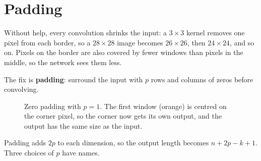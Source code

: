 \documentclass[12pt, a4paper]{article}
\begin{document}
\section{Padding}

Without help, every convolution shrinks the input: a $3 \times 3$ kernel
removes one pixel from each border, so a $28 \times 28$ image becomes
$26 \times 26$, then $24 \times 24$, and so on. Pixels on the border are also
covered by fewer windows than pixels in the middle, so the network sees them
less.

The fix is \textbf{padding}: surround the input with $p$ rows and columns of
zeros before convolving.

\begin{figure}[H]
  \centering
  \caption{Zero padding with $p = 1$. The first window (orange) is centred on
    the corner pixel, so the corner now gets its own output, and the output
    has the same size as the input.}
  \label{fig:padding}
\end{figure}

Padding adds $2p$ to each dimension, so the output length becomes
$n + 2p - k + 1$. Three choices of $p$ have names.
\end{document}
